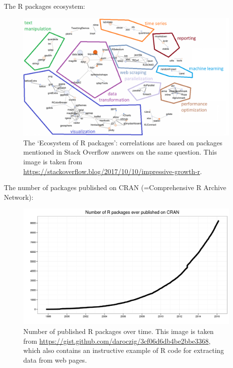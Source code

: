 \documentclass{beamer}
\begin{document}
\begin{frame}[allowframebreaks]
	The R packages ecosystem:
		\begin{figure}
		\centering
		\includegraphics[width=.8\textwidth]{figures/rpackages_eco_cat}
		\caption{\scriptsize The `Ecosystem of R packages': correlations are based on packages mentioned in Stack Overflow answers on the same question. This image is taken from \tiny\url{https://stackoverflow.blog/2017/10/10/impressive-growth-r}\scriptsize.}
		\label{Fig: 1}
		\end{figure}
	
	The number of packages published on CRAN (=Comprehensive R Archive Network):
		\begin{figure}
		\centering
		\includegraphics[width=.75\textwidth]{figures/rpackages}
		\caption{\scriptsize Number of published R packages over time. This image is taken from \tiny\url{https://gist.github.com/daroczig/3cf06d6db4be2bbe3368}\scriptsize, which also contains an instructive example of R code for extracting data from web pages.}
		\label{Fig: 1}
		\end{figure}
	

\end{frame}
\end{document}
